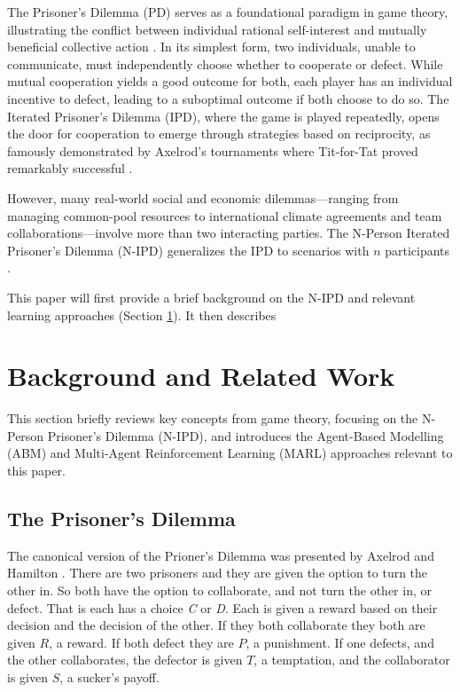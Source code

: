 \documentclass[]{llncs} %
\begin{document}
The Prisoner's Dilemma (PD) serves as a foundational paradigm in game
theory, illustrating the conflict between individual rational
self-interest and mutually beneficial collective action
\cite{Axelrod}.  In its simplest form, two individuals, unable to
communicate, must independently choose whether to cooperate or
defect. While mutual cooperation yields a good outcome for both, each
player has an individual incentive to defect, leading to a suboptimal
outcome if both choose to do so. The Iterated Prisoner's Dilemma
(IPD), where the game is played repeatedly, opens the door for
cooperation to emerge through strategies based on reciprocity, as
famously demonstrated by Axelrod's tournaments where Tit-for-Tat
proved remarkably successful \cite{Axelrod}.

However, many real-world social and economic dilemmas—ranging from
managing common-pool resources to international climate agreements and
team collaborations—involve more than two interacting parties. The
N-Person Iterated Prisoner's Dilemma (N-IPD) generalizes the IPD to
scenarios with $n$ participants \cite{Hamburger1973, Hardin1971}.


This paper will first provide a brief background on the N-IPD and
relevant learning approaches (Section \ref{sec:background}). It then
describes



\section{Background and Related Work}
\label{sec:background} %

This section briefly reviews key concepts from game theory, focusing on the
N-Person Prisoner's Dilemma (N-IPD), and introduces the Agent-Based Modelling
(ABM) and Multi-Agent Reinforcement Learning (MARL) approaches relevant to this
paper. 

\subsection{The Prisoner's Dilemma}
The canonical version of the Prioner's Dilemma was presented by
Axelrod and Hamilton \cite {Axelrod}.  There are two prisoners
and they are given the option to turn the other in.  So both have
the option to collaborate, and not turn the other in, or defect.
That is each has a choice {\it C} or {\it D}.  Each is given a reward
based on their decision and the decision of the other.  If they both
collaborate they both are given $R$, a reward.  If both defect they
are $P$, a punishment.  If one defects, and the other collaborates,
the defector is given $T$, a temptation, and the collaborator is given
$S$, a sucker's payoff.  
\end{document}
